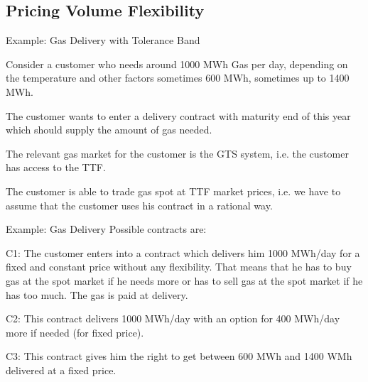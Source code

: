 



\subsection{Pricing Volume Flexibility}

{Example: Gas Delivery with Tolerance Band}






	Consider a customer who needs around 1000 MWh Gas per day, depending on the temperature and other factors sometimes 600 MWh, sometimes up to 1400 MWh.

	The customer wants to enter a delivery contract with maturity end of this year which should supply the amount of gas needed.

	The relevant gas market for the customer is the GTS system, i.e. the customer has access to the TTF.

	The customer is able to trade gas spot at TTF market prices, i.e. we have to assume that the customer uses his contract in a rational way.






{Example: Gas Delivery}
Possible contracts are:






	C1: The customer enters into a contract which delivers him 1000 MWh/day for a fixed and constant price without any flexibility. That means that he has to buy gas at the spot market if he needs more or has to sell gas at the spot market if he has too much. The gas is paid at delivery.

	C2: This contract delivers 1000 MWh/day with an option for 400 MWh/day more if needed (for fixed price).

	C3: This contract gives him the right to get between 600 MWh and 1400 WMh delivered at a fixed price.






